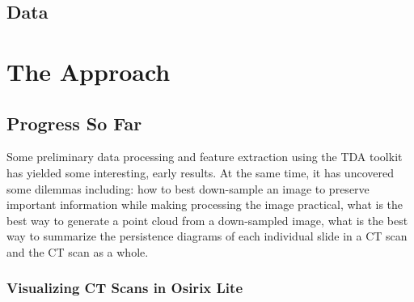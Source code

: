 \documentclass[12pt]{report}
\begin{document}
\section{Data}

\chapter{The Approach}

\section{Progress So Far}

\par
Some preliminary data processing and feature extraction using the TDA toolkit has yielded some interesting, early results. At the same time, it has uncovered some dilemmas including: how to best down-sample an image to preserve important information while making processing the image practical, what is the best way to generate a point cloud from a down-sampled image, what is the best way to summarize the persistence diagrams of each individual slide in a CT scan and the CT scan as a whole.

\subsection{Visualizing CT Scans in Osirix Lite}
\end{document}

